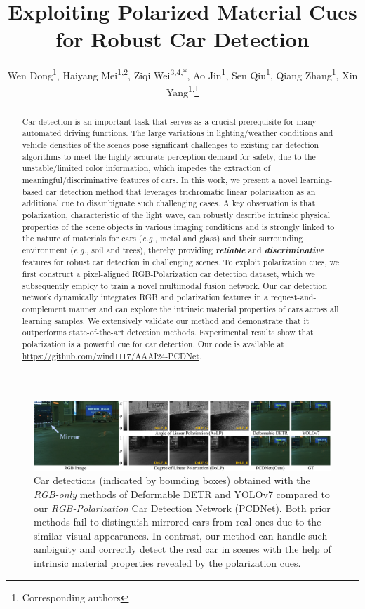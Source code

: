 \documentclass[letterpaper]{article} %
\title{Exploiting Polarized Material Cues for Robust Car Detection}
\author {
    Wen Dong\textsuperscript{\rm 1},
    Haiyang Mei\textsuperscript{\rm 1,2},
    Ziqi Wei\textsuperscript{\rm 3,4,$\ast$},
    Ao Jin\textsuperscript{\rm 1},
    Sen Qiu\textsuperscript{\rm 1},
    Qiang Zhang\textsuperscript{\rm 1},
    Xin Yang\textsuperscript{\rm 1,}\thanks{Corresponding authors}
}
\begin{document}
\maketitle

\begin{figure}[ht]
  \centering
  \includegraphics[width=\textwidth]{figure/teaser.pdf}
  \caption{Car detections (indicated by  bounding boxes) obtained with the \textit{RGB-only} methods of Deformable DETR \cite{zhu2020deformable} and YOLOv7 \cite{wang2022yolov7} compared to our \textit{RGB-Polarization} Car Detection Network (PCDNet). Both prior methods fail to distinguish mirrored cars from real ones due to the similar visual appearances. In contrast, our method can handle such ambiguity and correctly detect the real car in scenes with the help of intrinsic material properties revealed by the polarization cues.}
  \label{fig:teaser}
\end{figure}

\begin{abstract}
Car detection is an important task that serves as a crucial prerequisite for many automated driving functions. The large variations in lighting/weather conditions and vehicle densities of the scenes pose significant challenges to existing car detection algorithms to meet the highly accurate perception demand for safety, due to the unstable/limited color information, which impedes the extraction of meaningful/discriminative features of cars. In this work, we present a novel learning-based car detection method that leverages trichromatic linear polarization as an additional cue to disambiguate such challenging cases. A key observation is that polarization, characteristic of the light wave, can robustly describe intrinsic physical properties of the scene objects in various imaging conditions and is strongly linked to the nature of materials for cars (\textit{e.g.}, metal and glass) and their surrounding environment (\textit{e.g.}, soil and trees), thereby providing \textbf{\textit{reliable}} and \textbf{\textit{discriminative}} features for robust car detection in challenging scenes. To exploit polarization cues, we first construct a pixel-aligned RGB-Polarization car detection dataset, which we subsequently employ to train a novel multimodal fusion network. Our car detection network dynamically integrates RGB and polarization features in a request-and-complement manner and can explore the intrinsic material properties of cars across all learning samples. We extensively validate our method and demonstrate that it outperforms state-of-the-art detection methods. Experimental results show that polarization is a powerful cue for car detection. Our code is available at \url{https://github.com/wind1117/AAAI24-PCDNet}.
\end{abstract}














\end{document}
